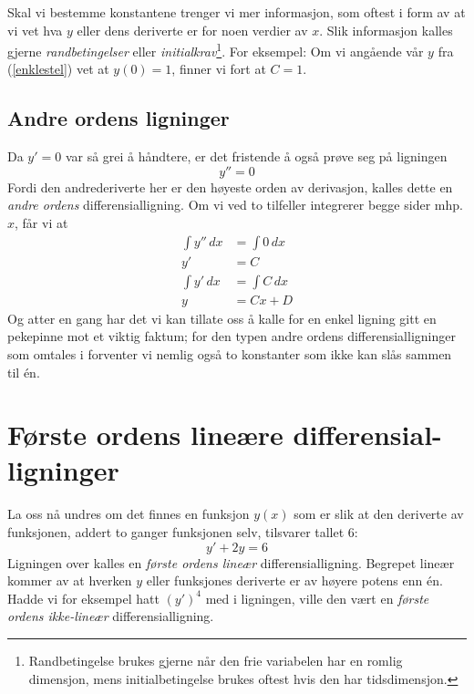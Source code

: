 Skal vi bestemme konstantene trenger vi mer informasjon, som oftest i form av at vi vet hva $ y$ eller dens deriverte er for noen verdier av $ x $. Slik informasjon kalles gjerne \textit{randbetingelser} eller \textit{initialkrav}\footnote{Randbetingelse brukes gjerne når den frie variabelen har en romlig dimensjon, mens initialbetingelse brukes oftest hvis den har tidsdimensjon.}. For eksempel: Om vi angående vår $ y $ fra (\ref{enklestel}) vet at $  {y(0)=1 }$, finner vi fort at $ {C=1} $.

\subsection{Andre ordens ligninger}
Da $ {y'=0 }$ var så grei å håndtere, er det fristende å også prøve seg på ligningen
\[ y''=0 \]
Fordi den andrederiverte her er den høyeste orden av derivasjon, kalles dette en \textit{andre ordens} differensialligning. Om vi ved to tilfeller integrerer begge sider mhp. $ x $, får vi at
\begin{align}
	\int y''\, dx &= \int 0 \, dx \nonumber\\
	y' &= C \nonumber\\
	\int y'\, dx &= \int C \, dx \nonumber\\
	y &= Cx + D
\end{align}
Og atter en gang har det vi kan tillate oss å kalle for en enkel ligning gitt en pekepinne mot et viktig faktum; for den typen andre ordens differensialligninger som omtales i  forventer vi nemlig også to konstanter som ikke kan slås sammen til én.

\section[Første ordens lineære differensialligninger]{Første ordens lineære differensial- \\ ligninger\label{fode}}
La oss nå undres om det finnes en funksjon $ y(x) $ som er slik at den deriverte av funksjonen, addert to ganger funksjonen selv, tilsvarer tallet 6:
\begin{equation}
 y'+2y=6 \label{diff1}
\end{equation}
Ligningen over kalles en \textit{første ordens lineær} differensialligning. Begrepet lineær kommer av at hverken $ y $ eller funksjones deriverte er av høyere potens enn én. Hadde vi for eksempel hatt $ (y')^4 $ med i ligningen, ville den vært en \textit{første ordens ikke-lineær} differensialligning.\vsk

